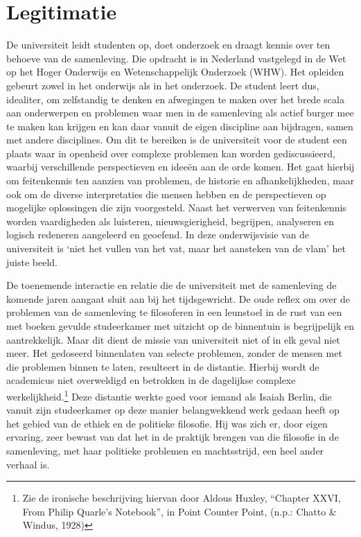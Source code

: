 \documentclass{jote-book}
\begin{document}
	\section{Legitimatie }



	De universiteit leidt studenten op, doet onderzoek en draagt kennis over ten behoeve van de samenleving. Die opdracht is in Nederland vastgelegd in de Wet op het Hoger Onderwijs en Wetenschappelijk Onderzoek (WHW). Het opleiden gebeurt zowel in het onderwijs als in het onderzoek. De student leert dus, idealiter, om zelfstandig te denken en afwegingen te maken over het brede scala aan onderwerpen en problemen waar men in de samenleving als actief burger mee te maken kan krijgen en kan daar vanuit de eigen discipline aan bijdragen, samen met andere disciplines. Om dit te bereiken is de universiteit voor de student een plaats waar in openheid over complexe problemen kan worden gediscussieerd, waarbij verschillende perspectieven en ideeën aan de orde komen. Het gaat hierbij om feitenkennis ten aanzien van problemen, de historie en afhankelijkheden, maar ook om de diverse interpretaties die mensen hebben en de perspectieven op mogelijke oplossingen die zijn voorgesteld. Naast het verwerven van feitenkennis worden vaardigheden als luisteren, nieuwsgierigheid, begrijpen, analyseren en logisch redeneren aangeleerd en geoefend. In deze onderwijsvisie van de universiteit is ‘niet het vullen van het vat, maar het aansteken van de vlam' het juiste beeld.



	De toenemende interactie en relatie die de universiteit met de samenleving de komende jaren aangaat sluit aan bij het tijdsgewricht. De oude reflex om over de problemen van de samenleving te filosoferen in een leunstoel in de rust van een met boeken gevulde studeerkamer met uitzicht op de binnentuin is begrijpelijk en aantrekkelijk. Maar dit dient de missie van universiteit niet of in elk geval niet meer. Het gedoseerd binnenlaten van selecte problemen, zonder de mensen met die problemen binnen te laten, resulteert in de distantie. Hierbij wordt de academicus niet overweldigd en betrokken in de dagelijkse complexe werkelijkheid.\footnote{Zie de ironische beschrijving hiervan door Aldous Huxley, “Chapter XXVI, From Philip Quarle's Notebook”, in Point Counter Point, (n.p.: Chatto \& Windus, 1928)} Deze distantie werkte goed voor iemand als Isaiah Berlin, die vanuit zijn studeerkamer op deze manier belangwekkend werk gedaan heeft op het gebied van de ethiek en de politieke filosofie. Hij was zich er, door eigen ervaring, zeer bewust van dat het in de praktijk brengen van die filosofie in de samenleving, met haar politieke problemen en machtsstrijd, een heel ander verhaal is.
\end{document}
